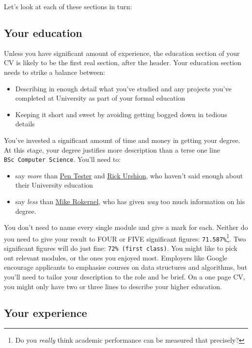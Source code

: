 \documentclass[
]{book}
\providecommand{\tightlist}{%
  \setlength{\itemsep}{0pt}\setlength{\parskip}{0pt}}
\begin{document}
Let's look at each of these sections in turn:

\hypertarget{mycved}{%
\subsection{Your education}\label{mycved}}

Unless you have significant amount of experience, the education section of your CV is likely to be the first real section, after the header. Your education section needs to strike a balance between:

\begin{itemize}
\tightlist
\item
  Describing in enough detail what you've studied and any projects you've completed at University as part of your formal education
\item
  Keeping it short and sweet by avoiding getting bogged down in tedious details
\end{itemize}

You've invested a significant amount of time and money in getting your degree. At this stage, your degree justifies more description than a terse one line \texttt{BSc\ Computer\ Science}. You'll need to:

\begin{itemize}
\tightlist
\item
  say \emph{more} than \href{Penelope_Tester.pdf}{Pen Tester} and \href{Rick_Urshion.pdf}{Rick Urshion}, who haven't said enough about their University education
\item
  say \emph{less} than \href{Mike_Rokernel.pdf}{Mike Rokernel}, who has given \emph{way} too much information on his degree.
\end{itemize}

You don't need to name every single module and give a mark for each. Neither do you need to give your result to FOUR or FIVE significant figures: \texttt{71.587\%}\footnote{Do you \emph{really} think academic performance can be measured that precisely?}. Two significant figures will do just fine: \texttt{72\%\ (first\ class)}. You might like to pick out relevant modules, or the ones you enjoyed most. Employers like Google encourage applicants to emphasise courses on data structures and algorithms, but you'll need to tailor your description to the role and be brief. On a one page CV, you might only have two or three lines to describe your higher education.

\hypertarget{mycvex}{%
\subsection{Your experience}\label{mycvex}}
\end{document}
